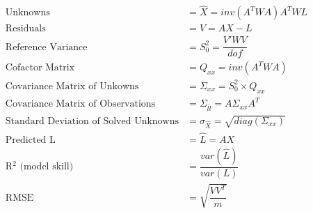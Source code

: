 \begin{align*}
	\text{Unknowns} &= \hat{X} = inv(A^TWA)A^TWL\\
	\text{Residuals} &= V = AX - L\\
	\text{Reference Variance} &= S_0^2 = \dfrac{V'WV}{dof} \\
	\text{Cofactor Matrix} &= Q_{xx} = inv(A^TWA) \\
	\text{Covariance Matrix of Unkowns} &= \Sigma_{xx} = S_0^2 \times Q_{xx} \\
	\text{Covariance Matrix of Observations} &= \Sigma_{\hat{l}\hat{l}} = A \Sigma_{xx} A^T \\
	\text{Standard Deviation of Solved Unknowns} &= \sigma_{\hat{X}} = \sqrt{diag(\Sigma_{xx})} \\
	\text{Predicted L} &= \hat{L} = AX \\
	\text{R$^2$ (model skill)} &= \dfrac{var(\hat{L})}{var(L)} \\
	\text{RMSE } &= \sqrt{\dfrac{VV^T}{m}} \\
\end{align*}
\clearpage

